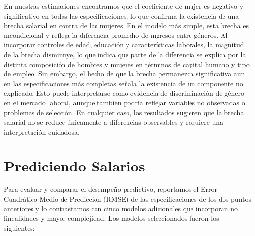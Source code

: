 \documentclass[12pt,a4paper,onecolumn]{article}
\begin{document}
En nuestras estimaciones encontramos que el coeficiente de mujer es negativo y significativo en todas las especificaciones, lo que confirma la existencia de una brecha salarial en contra de las mujeres. En el modelo más simple, esta brecha es incondicional y refleja la diferencia promedio de ingresos entre géneros. Al incorporar controles de edad, educación y características laborales, la magnitud de la brecha disminuye, lo que indica que parte de la diferencia se explica por la distinta composición de hombres y mujeres en términos de capital humano y tipo de empleo. Sin embargo, el hecho de que la brecha permanezca significativa aun en las especificaciones más completas señala la existencia de un componente no explicado. Esto puede interpretarse como evidencia de discriminación de género en el mercado laboral, aunque también podría reflejar variables no observadas o problemas de selección. En cualquier caso, los resultados sugieren que la brecha salarial no se reduce únicamente a diferencias observables y requiere una interpretación cuidadosa.

\section{Prediciendo Salarios}

Para evaluar y comparar el desempeño predictivo, reportamos el Error Cuadrático Medio de Predicción (RMSE) de las especificaciones de los dos puntos anteriores y lo contrastamos con cinco modelos adicionales que incorporan no linealidades y mayor complejidad. Los modelos seleccionados fueron los siguientes:
\end{document}
